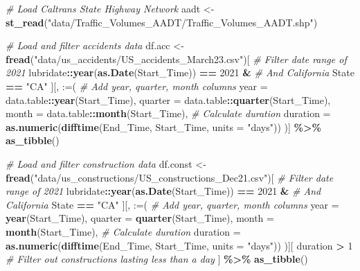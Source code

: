 \documentclass[
]{article}
\newenvironment{Shaded}{\begin{snugshade}}{\end{snugshade}}
\newcommand{\AttributeTok}[1]{\textcolor[rgb]{0.13,0.29,0.53}{#1}}
\newcommand{\CommentTok}[1]{\textcolor[rgb]{0.56,0.35,0.01}{\textit{#1}}}
\newcommand{\DecValTok}[1]{\textcolor[rgb]{0.00,0.00,0.81}{#1}}
\newcommand{\FunctionTok}[1]{\textcolor[rgb]{0.13,0.29,0.53}{\textbf{#1}}}
\newcommand{\NormalTok}[1]{#1}
\newcommand{\OtherTok}[1]{\textcolor[rgb]{0.56,0.35,0.01}{#1}}
\newcommand{\SpecialCharTok}[1]{\textcolor[rgb]{0.81,0.36,0.00}{\textbf{#1}}}
\newcommand{\StringTok}[1]{\textcolor[rgb]{0.31,0.60,0.02}{#1}}
\begin{document}
\begin{Shaded}
\begin{Highlighting}[]
\CommentTok{\# Load Caltrans State Highway Network}
\NormalTok{aadt }\OtherTok{\textless{}{-}} \FunctionTok{st\_read}\NormalTok{(}\StringTok{"data/Traffic\_Volumes\_AADT/Traffic\_Volumes\_AADT.shp"}\NormalTok{)}

\CommentTok{\# Load and filter accidents data}
\NormalTok{df.acc }\OtherTok{\textless{}{-}} \FunctionTok{fread}\NormalTok{(}\StringTok{"data/us\_accidents/US\_accidents\_March23.csv"}\NormalTok{)[}
  \CommentTok{\# Filter date range of 2021}
\NormalTok{  lubridate}\SpecialCharTok{::}\FunctionTok{year}\NormalTok{(}\FunctionTok{as.Date}\NormalTok{(Start\_Time)) }\SpecialCharTok{==} \DecValTok{2021} \SpecialCharTok{\&} 
  \CommentTok{\# And California}
\NormalTok{  State }\SpecialCharTok{==} \StringTok{"CA"}
\NormalTok{][, }\StringTok{\textasciigrave{}}\AttributeTok{:=}\StringTok{\textasciigrave{}}\NormalTok{(}
  \CommentTok{\# Add year, quarter, month columns}
  \AttributeTok{year =}\NormalTok{ data.table}\SpecialCharTok{::}\FunctionTok{year}\NormalTok{(Start\_Time),}
  \AttributeTok{quarter =}\NormalTok{ data.table}\SpecialCharTok{::}\FunctionTok{quarter}\NormalTok{(Start\_Time),}
  \AttributeTok{month =}\NormalTok{ data.table}\SpecialCharTok{::}\FunctionTok{month}\NormalTok{(Start\_Time),}
  \CommentTok{\# Calculate duration}
  \AttributeTok{duration =} \FunctionTok{as.numeric}\NormalTok{(}\FunctionTok{difftime}\NormalTok{(End\_Time, Start\_Time, }\AttributeTok{units =} \StringTok{"days"}\NormalTok{))}
\NormalTok{)] }\SpecialCharTok{\%\textgreater{}\%} 
  \FunctionTok{as\_tibble}\NormalTok{()}

\CommentTok{\# Load and filter construction data}
\NormalTok{df.const }\OtherTok{\textless{}{-}} \FunctionTok{fread}\NormalTok{(}\StringTok{"data/us\_constructions/US\_constructions\_Dec21.csv"}\NormalTok{)[}
  \CommentTok{\# Filter date range of 2021}
\NormalTok{  lubridate}\SpecialCharTok{::}\FunctionTok{year}\NormalTok{(}\FunctionTok{as.Date}\NormalTok{(Start\_Time)) }\SpecialCharTok{==} \DecValTok{2021} \SpecialCharTok{\&} 
  \CommentTok{\# And California}
\NormalTok{  State }\SpecialCharTok{==} \StringTok{"CA"}
\NormalTok{][, }\StringTok{\textasciigrave{}}\AttributeTok{:=}\StringTok{\textasciigrave{}}\NormalTok{(}
  \CommentTok{\# Add year, quarter, month columns}
  \AttributeTok{year =} \FunctionTok{year}\NormalTok{(Start\_Time),}
  \AttributeTok{quarter =} \FunctionTok{quarter}\NormalTok{(Start\_Time),}
  \AttributeTok{month =} \FunctionTok{month}\NormalTok{(Start\_Time),}
  \CommentTok{\# Calculate duration}
  \AttributeTok{duration =} \FunctionTok{as.numeric}\NormalTok{(}\FunctionTok{difftime}\NormalTok{(End\_Time, Start\_Time, }\AttributeTok{units =} \StringTok{"days"}\NormalTok{))}
\NormalTok{)][}
\NormalTok{  duration }\SpecialCharTok{\textgreater{}} \DecValTok{1}  \CommentTok{\# Filter out constructions lasting less than a day}
\NormalTok{] }\SpecialCharTok{\%\textgreater{}\%} 
  \FunctionTok{as\_tibble}\NormalTok{()}
\end{Highlighting}
\end{Shaded}
\end{document}
